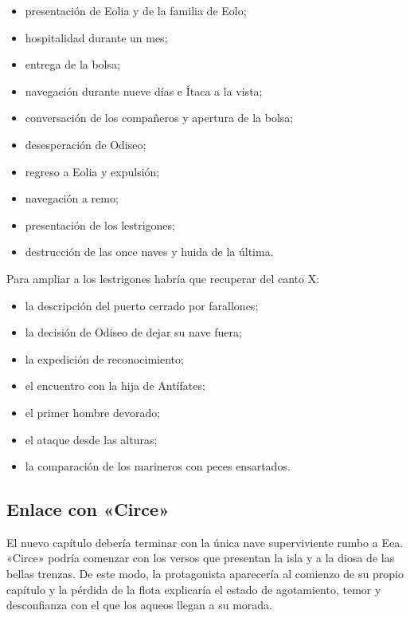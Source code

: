 \begin{itemize}
\item presentación de Eolia y de la familia de Eolo;
\item hospitalidad durante un mes;
\item entrega de la bolsa;
\item navegación durante nueve días e Ítaca a la vista;
\item conversación de los compañeros y apertura de la bolsa;
\item desesperación de Odiseo;
\item regreso a Eolia y expulsión;
\item navegación a remo;
\item presentación de los lestrigones;
\item destrucción de las once naves y huida de la última.
\end{itemize}

Para ampliar a los lestrigones habría que recuperar del canto X:

\begin{itemize}
\item la descripción del puerto cerrado por farallones;
\item la decisión de Odiseo de dejar su nave fuera;
\item la expedición de reconocimiento;
\item el encuentro con la hija de Antífates;
\item el primer hombre devorado;
\item el ataque desde las alturas;
\item la comparación de los marineros con peces ensartados.
\end{itemize}

\subsection*{Enlace con «Circe»}

El nuevo capítulo debería terminar con la única nave superviviente rumbo a
Eea. «Circe» podría comenzar con los versos que presentan la isla y a la diosa
de las bellas trenzas. De este modo, la protagonista aparecería al comienzo de
su propio capítulo y la pérdida de la flota explicaría el estado de agotamiento,
temor y desconfianza con el que los aqueos llegan a su morada.

